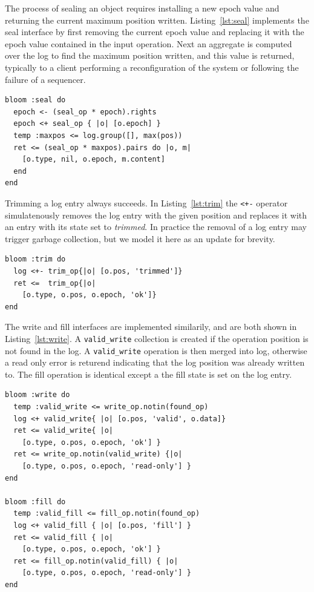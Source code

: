 \documentclass[10pt,twocolumn]{article}
\begin{document}
The process of sealing an object requires installing a new epoch value and
returning the current maximum position written. Listing~\ref{lst:seal}
implements the seal interface by first removing the current epoch value and
replacing it with the epoch value contained in the input operation. Next an
aggregate is computed over the log to find the maximum position written, and
this value is returned, typically to a client performing a reconfiguration of
the system or following the failure of a sequencer.

\begin{lstlisting}[caption={Seal}, label=lst:seal]
bloom :seal do
  epoch <- (seal_op * epoch).rights
  epoch <+ seal_op { |o| [o.epoch] }
  temp :maxpos <= log.group([], max(pos))
  ret <= (seal_op * maxpos).pairs do |o, m|
    [o.type, nil, o.epoch, m.content]
  end
end
\end{lstlisting}

Trimming a log entry always succeeds. In Listing~\ref{lst:trim} the
\texttt{<+-} operator simulatenously removes the log entry with the given 
position and replaces it with an entry with its state set to \emph{trimmed}.
In practice the removal of a log entry may trigger garbage collection, but
we model it here as an update for brevity.

\begin{lstlisting}[caption={Trim}, label=lst:trim]
bloom :trim do
  log <+- trim_op{|o| [o.pos, 'trimmed']}
  ret <=  trim_op{|o|
    [o.type, o.pos, o.epoch, 'ok']}
end
\end{lstlisting}

The write and fill interfaces are implemented similarily, and are both shown in
Listing~\ref{lst:write}.  A \texttt{valid\_write} collection is created if the
operation position is not found in the log.  A \texttt{valid\_write} operation
is then merged into log, otherwise a read only error is returend indicating
that the log position was already written to.  The fill operation is identical
except a the fill state is set on the log entry.

\begin{lstlisting}[caption={Write and Fill}, label=lst:write]
bloom :write do
  temp :valid_write <= write_op.notin(found_op)
  log <+ valid_write{ |o| [o.pos, 'valid', o.data]}
  ret <= valid_write{ |o|
    [o.type, o.pos, o.epoch, 'ok'] }
  ret <= write_op.notin(valid_write) {|o|
    [o.type, o.pos, o.epoch, 'read-only'] }
end

bloom :fill do
  temp :valid_fill <= fill_op.notin(found_op)
  log <+ valid_fill { |o| [o.pos, 'fill'] }
  ret <= valid_fill { |o|
    [o.type, o.pos, o.epoch, 'ok'] }
  ret <= fill_op.notin(valid_fill) { |o|
    [o.type, o.pos, o.epoch, 'read-only'] }
end
\end{lstlisting}
\end{document}
